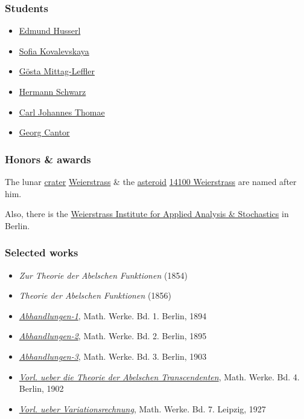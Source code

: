 \documentclass{article}
\begin{document}
\subsubsection{Students}
\begin{itemize}
	\item \href{https://en.wikipedia.org/wiki/Edmund_Husserl}{Edmund Husserl}
	\item \href{https://en.wikipedia.org/wiki/Sofia_Kovalevskaya}{Sofia Kovalevskaya}
	\item \href{https://en.wikipedia.org/wiki/G%C3%B6sta_Mittag-Leffler}{Gösta Mittag-Leffler}
	\item \href{https://en.wikipedia.org/wiki/Hermann_Schwarz}{Hermann Schwarz}
	\item \href{https://en.wikipedia.org/wiki/Carl_Johannes_Thomae}{Carl Johannes Thomae}
	\item \href{https://en.wikipedia.org/wiki/Georg_Cantor}{Georg Cantor}
\end{itemize}

\subsubsection{Honors \& awards}
The lunar \href{https://en.wikipedia.org/wiki/Impact_crater}{crater} \href{https://en.wikipedia.org/wiki/Weierstrass_(crater)}{Weierstrass} \& the \href{https://en.wikipedia.org/wiki/Asteroid}{asteroid} \href{https://en.wikipedia.org/wiki/14100_Weierstrass}{14100 Weierstrass} are named after him.

Also, there is the \href{https://en.wikipedia.org/wiki/Weierstrass_Institute_for_Applied_Analysis_and_Stochastics}{Weierstrass Institute for Applied Analysis \& Stochastics} in Berlin.

\subsubsection{Selected works}
\begin{itemize}
	\item \textit{Zur Theorie der Abelschen Funktionen} (1854)
	\item \textit{Theorie der Abelschen Funktionen} (1856)
	\item \href{http://name.umdl.umich.edu/AAN8481.0001.001}{\textit{Abhandlungen-1}}, Math. Werke. Bd. 1. Berlin, 1894
	\item \href{http://name.umdl.umich.edu/AAN8481.0002.001}{\textit{Abhandlungen-2}}, Math. Werke. Bd. 2. Berlin, 1895
	\item \href{http://name.umdl.umich.edu/AAN8481.0003.001}{\textit{Abhandlungen-3}}, Math. Werke. Bd. 3. Berlin, 1903
	\item \href{http://name.umdl.umich.edu/AAN8481.0004.001}{\textit{Vorl. ueber die Theorie der Abelschen Transcendenten}}, Math. Werke. Bd. 4. Berlin, 1902
	\item \href{http://name.umdl.umich.edu/AAN8481.0007.001}{\textit{Vorl. ueber Variationsrechnung}}, Math. Werke. Bd. 7. Leipzig, 1927
\end{itemize}
\end{document}
